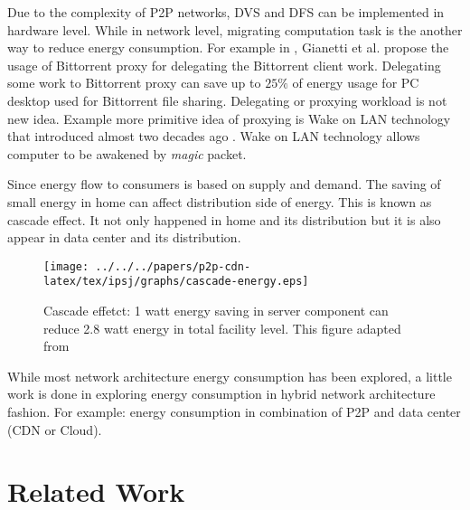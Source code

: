 Due to the complexity of P2P networks, DVS and DFS can be implemented in hardware level.  
While in network level, migrating computation task is the another way to reduce energy consumption.  
For example in \cite{6249349}, Gianetti et al. propose the usage of Bittorrent proxy for  delegating the Bittorrent client work. 
Delegating some work to Bittorrent proxy can save up to $25\%$ of energy usage for PC desktop used for Bittorrent file sharing.
Delegating or proxying workload is not new idea.  
Example more primitive idea of proxying is Wake on LAN technology that introduced almost two decades ago \cite{wakeonlan}.
Wake on LAN technology allows computer to be awakened by \textit{magic} packet.

Since energy flow to consumers is based on supply and demand. 
The saving of small energy in home can affect distribution side of energy. 
This is known as cascade effect. 
It not only happened in home and its distribution but it is also appear in data center and its distribution.  

\begin{figure}[tb]
\begin{center}
\texttt{[image: ../../../papers/p2p-cdn-latex/tex/ipsj/graphs/cascade-energy.eps]}
\end{center}
\caption{Cascade effetct:  1 watt energy saving in server component can reduce 2.8 watt energy in total facility level. This figure adapted from \cite{ciscocascade}} 
\label{fig:energycascade}
\end{figure}

While most network architecture energy consumption has been explored, a little work is done in exploring energy consumption in hybrid network architecture fashion. 
For example: energy consumption in combination of P2P and data center (CDN or Cloud).


\section{Related Work}

